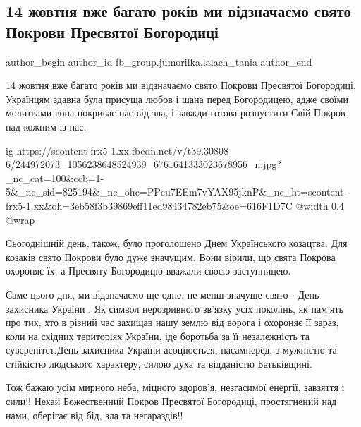  
 
 
 
 
 
\subsection{14 жовтня вже багато років ми відзначаємо свято Покрови Пресвятої Богородиці}
\label{sec:14_10_2021.fb.fb_group.jumorilka.1.pokrova}
 
\ifcmt
 author_begin
   author_id fb_group.jumorilka,lalach_tania
 author_end
\fi

14 жовтня вже багато років ми відзначаємо свято Покрови Пресвятої Богородиці.
Українцям здавна була присуща любов і шана  перед Богородицею, адже своїми
молитвами вона покриває нас від зла, і завжди готова розпустити Свій Покров над
кожним із нас.

\ifcmt
  ig https://scontent-frx5-1.xx.fbcdn.net/v/t39.30808-6/244972073_1056238648524939_6761641333023678956_n.jpg?_nc_cat=100&ccb=1-5&_nc_sid=825194&_nc_ohc=PPcu7EEm7vYAX95jknP&_nc_ht=scontent-frx5-1.xx&oh=3eb58f3b39869eff11ed98434782eb75&oe=616F1D7C
  @width 0.4
  @wrap 
\fi

Сьогоднішній день, також, було проголошено Днем Українського козацтва. Для
козаків свято Покрови було дуже значущим. Вони вірили, що  свята Покрова
охороняє їх, а Пресвяту Богородицю вважали своєю заступницею.

Саме цього дня, ми відзначаємо ще одне, не менш значуще свято - День
захисника України . Як символ нерозривного зв'язку усіх поколінь, як пам'ять
про тих, хто в різний час захищав нашу землю від ворога і охороняє її зараз,
коли на східних територіях України, іде боротьба за її незалежність та
суверенітет.День захисника України асоціюється, насамперед, з мужністю та
стійкістю людського характеру, силою духа та відданістю Батьківщині. 

Тож бажаю усім мирного неба, міцного здоров'я, незгасимої енергії, завзяття і
сили!! Нехай Божественний Покров Пресвятої Богородиці, простягнений над нами,
оберігає від бід, зла та негараздів!!
